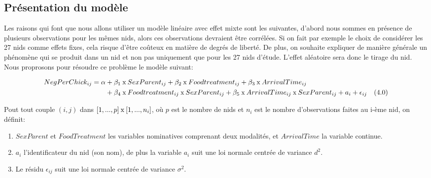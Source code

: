 \documentclass[11pt,fleqn]{book} %
\begin{document}
\newpage

\subsection{Présentation du modèle} 

\vspace{1em}

Les raisons qui font que nous allons utiliser un modèle linéaire avec effet mixte sont les suivantes, d'abord nous sommes en présence de plusieurs observations pour les mêmes nids, alors ces observations devraient être corrélées. Si on fait par exemple le choix de considérer les 27 nids comme effets fixes, cela risque d'être coûteux en matière de degrés de liberté. De plus, on souhaite expliquer de manière générale un phénomène qui se produit dans un nid et non pas uniquement que pour les 27 nids d'étude. L'effet aléatoire sera donc le tirage du nid. Nous proprosons pour résoudre ce problème le modèle suivant:

    \begin{align*}
    NegPerChick_{ij} = \alpha & + \beta_1\:\textnormal{x}\: SexParent_{ij} + \beta_2\:\textnormal{x}\: Foodtreatment_{ij} + \beta_3 \:\textnormal{x}\:ArrivalTime_{ij}\\ &+ \beta_4\:\textnormal{x}\: Foodtreatment_{ij}\:\textnormal{x}\:SexParent_{ij} + \beta_5\:\textnormal{x}\: ArrivalTime_{ij}\:\textnormal{x}\:SexParent_{ij} + a_{i} + \epsilon_{ij} \quad (4.0)
    \end{align*}
    
    \vspace{0.5em}

Pout tout couple $(i,j)$ dans $[1,...,p]\:\textnormal{x}\:[1,...,n_i]$, où $p$ est le nombre de nids et $n_i$ est le nombre d'observations faites au i-ème nid, on définit:

\begin{enumerate}
\item $SexParent$ et $FoodTreatment$ les variables nominatives comprenant deux modalités,
et $ArrivalTime$ la variable continue.
\item $a_i$ l'identificateur du nid (son nom), de plus la variable $a_i$  suit une loi normale centrée de variance $d^2$.
\item Le résidu $\epsilon_{ij}$ suit une loi normale centrée de variance $\sigma^2$.
\end{enumerate}

 \vspace{1em}
 
\end{document}
